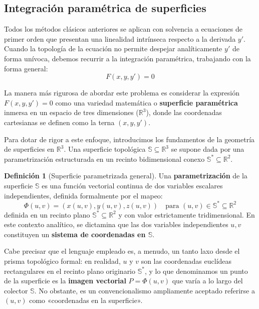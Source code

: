 \documentclass[11pt,a4paper]{article}
\theoremstyle{definition}
\newtheorem{definition}{Definición}[section]
\theoremstyle{plain}
\begin{document}
\subsection{Integración paramétrica de superficies}

Todos los métodos clásicos anteriores se aplican con solvencia a ecuaciones de primer orden que presentan una linealidad intrínseca respecto a la derivada $y'$. Cuando la topología de la ecuación no permite despejar analíticamente $y'$ de forma unívoca, debemos recurrir a la integración paramétrica, trabajando con la forma general:
$$ F(x,y,y') = 0 $$

La manera más rigurosa de abordar este problema es considerar la expresión $F(x,y,y') = 0$ como una variedad matemática o \textbf{superficie paramétrica} inmersa en un espacio de tres dimensiones ($\mathbb{R}^3$), donde las coordenadas cartesianas se definen como la terna $(x,y,y')$.

Para dotar de rigor a este enfoque, introducimos los fundamentos de la geometría de superficies en $\mathbb{R}^3$. Una superficie topológica $\mathbb{S} \subseteq \mathbb{R}^3$ se supone dada por una parametrización estructurada en un recinto bidimensional conexo $\mathbb{S}^* \subseteq \mathbb{R}^2$. 

\begin{definition}[Superficie parametrizada general]
Una \textbf{parametrización} de la superficie $\mathbb{S}$ es una función vectorial continua de dos variables escalares independientes, definida formalmente por el mapeo:
$$ \Phi(u,v) = (x(u,v), y(u,v), z(u,v)) \quad \text{para } (u,v) \in \mathbb{S}^* \subseteq \mathbb{R}^2 $$
definida en un recinto plano $\mathbb{S}^* \subseteq \mathbb{R}^2$ y con valor estrictamente tridimensional. En este contexto analítico, se dictamina que las dos variables independientes $u,v$ constituyen un \textbf{sistema de coordenadas en $\mathbb{S}$}. 
\end{definition}

Cabe precisar que el lenguaje empleado es, a menudo, un tanto laxo desde el prisma topológico formal: en realidad, $u$ y $v$ son las coordenadas euclídeas rectangulares en el recinto plano originario $\mathbb{S}^*$, y lo que denominamos un punto de la superficie es la \textbf{imagen vectorial} $P = \Phi(u,v)$ que varía a lo largo del colector $\mathbb{S}$. No obstante, es un convencionalismo ampliamente aceptado referirse a $(u,v)$ como «coordenadas en la superficie».
\end{document}
